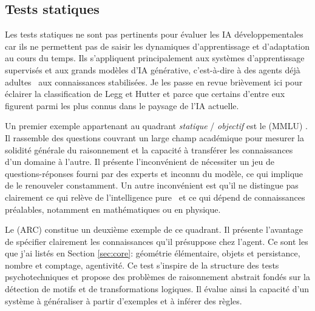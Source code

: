 \subsection{Tests statiques}

\noindent
Les tests statiques ne sont pas pertinents pour évaluer les IA développementales car ils ne permettent pas de saisir les dynamiques d'apprentissage et d'adaptation au cours du temps. 
Ils s'appliquent principalement aux systèmes d'apprentissage supervisés et aux grands modèles d'IA générative, c'est-à-dire à des agents \og déjà adultes \fg\ aux connaissances stabilisées. 
Je les passe en revue brièvement ici pour éclairer la classification de Legg et Hutter et parce que certains d'entre eux figurent parmi les plus connus dans le paysage de l'IA actuelle.

Un premier exemple appartenant au quadrant \emph{statique} / \emph{objectif} est le   (MMLU) \cite{hendrycks_measuring_2021}. 
Il rassemble des questions couvrant un large champ académique pour mesurer la solidité générale du raisonnement et la capacité à transférer les connaissances d'un domaine à l'autre.
Il présente l'inconvénient de nécessiter un jeu de questions-réponses fourni par des experts et inconnu du modèle, ce qui implique de le renouveler constamment.
Un autre inconvénient est qu'il ne distingue pas clairement ce qui relève de l'intelligence \og pure \fg\ et ce qui dépend de connaissances préalables, notamment en mathématiques ou en physique.

Le  (ARC) \cite{chollet_measure_2019} constitue un deuxième exemple de ce quadrant.
Il présente l'avantage de spécifier clairement les connaissances qu'il présuppose chez l'agent. 
Ce sont les  que j'ai listés en Section \ref{sec:core}: géométrie élémentaire, objets et persistance, nombre et comptage, agentivité.
Ce test s’inspire de la structure des tests psychotechniques et propose des problèmes de raisonnement abstrait fondés sur la détection de motifs et de transformations logiques. 
Il évalue ainsi la capacité d’un système à généraliser à partir d’exemples et à inférer des règles.

